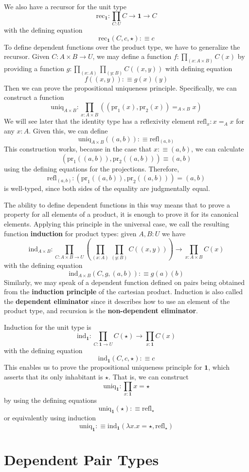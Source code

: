 We also have a recursor for the unit type \begin{equation*}
    \text{rec}_{\mathbf{1}}:\prod_{C:U}C\rightarrow \mathbf{1}\rightarrow C
\end{equation*}
with the defining equation \begin{equation*}
    \text{rec}_{\mathbf{1}}(C,c,\star) :\equiv c
\end{equation*}
To define dependent functions over the product type, we have to generalize the recursor. Given $C:A\times B\rightarrow U$, we may define a function $f:\prod_{(x:A\times B)}C(x)$ by providing a function $g:\prod_{(x:A)}\prod_{(y:B)}C((x,y))$ with defining equation $$f((x,y)) :\equiv g(x)(y)$$
Then we can prove the propositional uniqueness principle. Specifically, we can construct a function \begin{equation*}
    \text{uniq}_{A\times B}:\prod_{x:A\times B}((\text{pr}_1(x),\text{pr}_2(x)) =_{A\times B}x)
\end{equation*}
We will see later that the identity type has a reflexivity element $\text{refl}_x:x=_Ax$ for any $x:A$. Given this, we can define $$\text{uniq}_{A\times B}((a,b)) :\equiv \text{refl}_{(a,b)}$$
This construction works, because in the case that $x:\equiv (a,b)$, we can calculate $$(\text{pr}_1((a,b)),\text{pr}_2((a,b))) \equiv (a,b)$$
using the defining equations for the projections. Therefore, $$\text{refl}_{(a,b)}:(\text{pr}_1((a,b)),\text{pr}_2((a,b))) = (a,b)$$
is well-typed, since both sides of the equality are judgmentally equal.

The ability to define dependent functions in this way means that to prove a property for all elements of a product, it is enough to prove it for its canonical elements. Applying this principle in the universal case, we call the resulting function \textbf{induction} for product types: given $A,B:U$ we have $$\text{ind}_{A\times B}:\prod_{C:A\times B\rightarrow U}\left(\prod_{(x:A)}\prod_{(y:B)}C((x,y))\right)\rightarrow \prod_{x:A\times B}C(x)$$
with the defining equation $$\text{ind}_{A\times B}(C,g,(a,b)) :\equiv g(a)(b)$$
Similarly, we may speak of a dependent function defined on pairs being obtained from the \textbf{induction principle} of the cartesian product. Induction is also called the \textbf{dependent eliminator} since it describes how to use an element of the product type, and recursion is the \textbf{non-dependent eliminator}.

Induction for the unit type is \begin{equation*}
    \text{ind}_{\mathbf{1}}:\prod_{C:\mathbf{1}\rightarrow U}C(\star)\rightarrow \prod_{x:\mathbf{1}}C(x)
\end{equation*}
with the defining equation $$\text{ind}_{\mathbf{1}}(C,c,\star) :\equiv c$$
This enables us to prove the propositional uniqueness principle for $\mathbf{1}$, which asserts that its only inhabitant is $\star$. That is, we can construct $$\text{uniq}_{\mathbf{1}}:\prod_{x:\mathbf{1}}x=\star$$
by using the defining equations $$\text{uniq}_{\mathbf{1}}(\star):\equiv \text{refl}_{\star}$$
or equivalently using induction $$\text{uniq}_{\mathbf{1}} :\equiv \text{ind}_{\mathbf{1}}(\lambda x.x = \star,\text{refl}_{\star})$$


\section{Dependent Pair Types}


